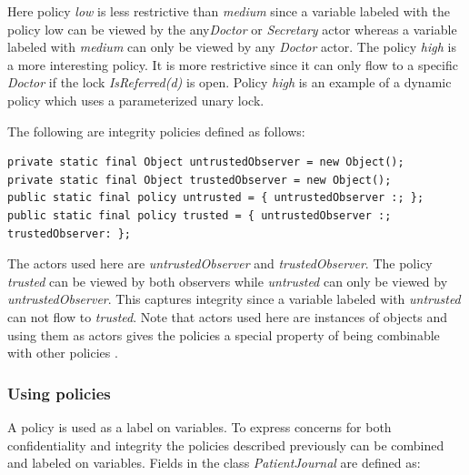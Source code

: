 Here policy \emph{low} is less restrictive than \emph{medium} since a variable labeled with the policy low can be viewed by the any\emph{Doctor} or \emph{Secretary} actor whereas a variable labeled with \emph{medium} can only be viewed by any \emph{Doctor} actor. The policy \emph{high} is a more interesting policy. It is more restrictive since it can only flow to a specific \emph{Doctor} if the lock \emph{IsReferred(d)} is open. Policy \emph{high} is an example of a dynamic policy which uses a parameterized unary lock.

The following are integrity policies defined as follows:
\begin{lstlisting}
private static final Object untrustedObserver = new Object();
private static final Object trustedObserver = new Object();
public static final policy untrusted = { untrustedObserver :; };
public static final policy trusted = { untrustedObserver :; trustedObserver: };
\end{lstlisting}


The actors used here are \emph{untrustedObserver} and \emph{trustedObserver}. The policy \emph{trusted} can be viewed by both observers while \emph{untrusted} can only be viewed by \emph{untrustedObserver}. This captures integrity since a variable labeled with \emph{untrusted} can not flow to \emph{trusted}. Note that actors used here are instances of objects and using them as actors gives the policies a special property of being combinable with other policies \cite{paragonprogramming}.





\subsubsection{Using policies}
A policy is used as a label on variables. To express concerns for both confidentiality and integrity the policies described previously can be combined and labeled on variables. Fields in the class \emph{PatientJournal} are defined as:

